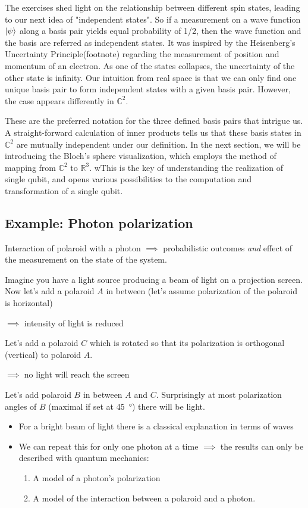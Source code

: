 \documentclass[12pt]{article}
\begin{document}
The exercises shed light on the relationship between different spin states, leading to our next idea of "independent states". So if a measurement on a wave function $\ket{\psi}$ along a basis pair yields equal probability of 1/2, then the wave function and the basis are referred as independent states. It was inspired by the Heisenberg's Uncertainty Principle(footnote) regarding the measurement of position and momentum of an electron. As one of the states collapses, the uncertainty of the other state is infinity. Our intuition from real space is that we can only find one unique basis pair to form independent states with a given basis pair. However, the case appears differently in $\mathbb{C}^2$. 


These are the preferred notation for the three defined basis pairs that intrigue us. A straight-forward calculation of inner products tells us that these basis states in $\mathbb{C}^2$ are mutually independent under our definition. 
In the next section, we will be introducing the Bloch's sphere visualization, which employs the method of mapping from $\mathbb{C}^2$ to $\mathbb{R}^3$. wThis is the key of understanding the realization of single qubit, and opens various possibilities to the computation and transformation of a single qubit.


\subsection{Example: Photon polarization}

Interaction of polaroid with a photon $\implies$ probabilistic outcomes
\emph{and} effect of the measurement on the state of the system.

Imagine you have a light source producing a beam of light on a projection
screen. Now let's add a polaroid $A$ in between (let's assume polarization of
the polaroid is horizontal)

$\implies$ intensity of light is reduced

Let's add a polaroid $C$ which is rotated so that its polarization is
orthogonal (vertical) to polaroid $A$.

$\implies$ no light will reach the screen

Let's add polaroid $B$ in between $A$ and $C$. Surprisingly at most
polarization angles of $B$ (maximal if set at \SI{45}{\degree}) there will be
light.

\begin{itemize}
    \item For a bright beam of light there is a classical explanation in terms
        of waves
    \item We can repeat this for only one photon at a time $\implies$ the
        results can only be described with quantum mechanics:
	\begin{enumerate}
		\item A model of a photon's polarization
		\item A model of the interaction between a polaroid and a photon.
	\end{enumerate}
\end{itemize}
\end{document}
